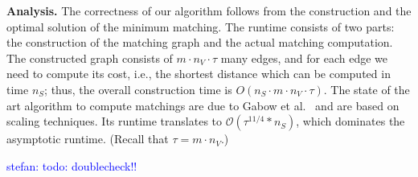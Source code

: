 \documentclass[9pt]{sigcomm-alternate}
\newcommand{\maciek}[1]{\textcolor{brown}{maciek: #1}}
\newcommand{\stefan}[1]{\textcolor{blue}{stefan: #1}}
\newcommand{\MaFactor}{m}
\newcommand{\ChunkType}{\tau}
\begin{document}
\textbf{Analysis.}
The correctness of our algorithm follows from the construction and the optimal
solution of the minimum matching.
The runtime consists of two parts: the construction of the matching graph and
the actual matching computation. The constructed graph consists of
$\MaFactor \cdot n_V \cdot \ChunkType$ many edges,
and for each edge we need to compute its cost, i.e., the shortest distance
which can be computed in time $n_S$; thus, the overall construction time
is $O(n_S \cdot \MaFactor \cdot n_V \cdot \ChunkType)$.
The state of the art algorithm to compute matchings are due to Gabow et al.~\cite{gabow_scaling_algorithm}
and are based on scaling techniques.
Its runtime translates to
$\mathcal{O}(\tau^{11/4}*n_S)$, which dominates the asymptotic runtime. (Recall that $\tau = \MaFactor\cdot n_V$.)

\stefan{todo: doublecheck!!}

\end{document}
